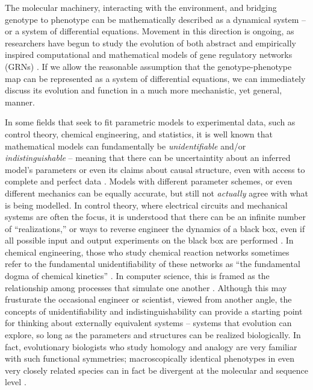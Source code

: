 \documentclass[11 pt]{article}
\begin{document}
The molecular machinery, interacting with the environment, and bridging genotype to phenotype
can be mathematically described as a dynamical system -- or a system of differential equations\citep{jaeger2015comet}.
 Movement in this direction is ongoing, as researchers have begun to study 
the evolution of both abstract \citep{wagner1994evolution, wagner1996does,  siegal2002waddington, bergman2003evolutionary} and empirically inspired computational and mathematical models of gene regulatory networks (GRNs) \citep{mjolsness1991connectionist, jaeger2004dynamic, maria1, vitaly1, vitaly2, crombach2016gap, wotton2015quantitative, chertkova2017insilico}. If we allow the reasonable assumption that the genotype-phenotype map can be represented as a system of differential equations, we can immediately discuss its evolution and function in a much more mechanistic, yet general, manner. 

In some fields that seek to fit parametric models to experimental data, such as control
theory, chemical engineering, and statistics, it is well known that mathematical models
can fundamentally be \emph{unidentifiable} and/or \emph{indistinguishable} -- meaning that 
there can be uncertaintity about an inferred model's parameters or even its claims about
causal structure, even with access to complete and perfect data \citep{bellman1970structural, grewal1976identifiability, walter1984structural}. Models with different 
parameter schemes, or even different mechanics can be equally accurate, but still not
\emph{actually} agree with what is being modelled. In control theory, where electrical 
circuits and mechanical systems are often the focus, it is understood that there can be an 
infinite number of ``realizations,'' or ways to reverse engineer the dynamics of a black box,
even if all possible input and output experiments on the black box are performed \citep{kalman1963mathematical, anderson1966equivalence, zadeh1976linear}. In chemical
engineering, those who study chemical reaction networks sometimes refer to the fundamental
unidentifiability of these networks as ``the fundamental dogma of chemical kinetics'' \citep{craciun2008identifiability}. In computer science, this is framed as the relationship among processes that simulate one another \citep{van2004equivalence}.
Although this may frusturate the occasional engineer or scientist, viewed from another angle,
the concepts of unidentifiability and indistinguishability can provide a starting point for
thinking about externally equivalent systems -- systems that evolution can explore, so long
as the parameters and structures can be realized biologically. In fact, evolutionary
biologists who study homology and analogy are very familiar with such functional symmetries; macroscopically identical phenotypes in even very closely related species can in fact be divergent at the molecular and sequence level \citep{true2001developmental, tsong2006evolution, hare2008sepsid, vierstra2014mouse, stergachis2014conservation, taylor2016diverse, matsui2015regulatory}.
\end{document}
